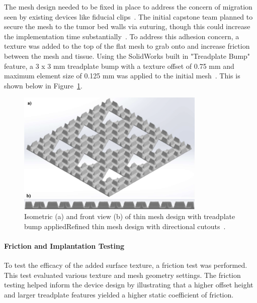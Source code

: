 The mesh design needed to be fixed in place to address the concern of migration seen by existing devices like fiducial clips~\cite{RefWorks:RefID:344-mitchell2019adaptable}. The initial capstone team planned to secure the mesh to the tumor bed walls via suturing, though this could increase the implementation time substantially~\cite{RefWorks:RefID:372-krakovskytumor}. To address this adhesion concern, a texture was added to the top of the flat mesh to grab onto and increase friction between the mesh and tissue. Using the SolidWorks built in "Treadplate Bump" feature, a 3 x 3 mm treadplate bump with a texture offset of 0.75 mm and maximum element size of 0.125 mm was applied to the initial mesh~\cite{RefWorks:RefID:371-bakhtardesign}. This is shown below in Figure~\ref{fig:introduction:meshWithTreadplate}.

\begin{figure}[h!]
        \centering
        \includegraphics[width=0.8\textwidth]{../figs/introduction/mesh_design_with_treadplate.png}
        \caption{Isometric (a) and front view (b) of thin mesh design with treadplate bump appliedRefined thin mesh design with directional cutouts~\cite{RefWorks:RefID:371-bakhtardesign}.}
        \label{fig:introduction:meshWithTreadplate}
\end{figure}

\paragraph*{Friction and Implantation Testing\label{introduction:priorWork:otherTeamWork:deviceDesign:frictionTesting}}
To test the efficacy of the added surface texture, a friction test was performed. This test evaluated various texture and mesh geometry settings. The friction testing helped inform the device design by illustrating that a higher offset height and larger treadplate features yielded a higher static coefficient of friction.

